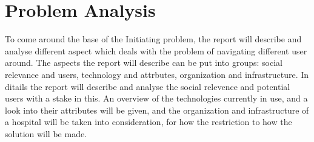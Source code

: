 \chapter{Problem Analysis} \label{cha:problem_analysis}

To come around the base of the Initiating problem, the report will describe and analyse different aspect which deals with the problem of navigating different user around. The aspects the report will describe can be put into groups: social relevance and users, technology and attrbutes, organization and infrastructure. In ditails the report will describe and analyse the social relevence and potential users with a stake in this. An overview of the technologies currently in use, and a look into their attributes will be given, and the organization and infrastructure of a hospital will be taken into consideration, for how the restriction to how the solution will be made.










